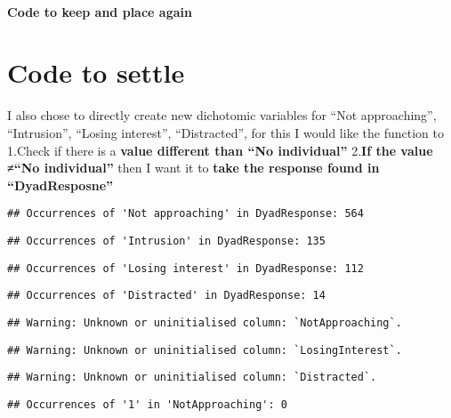 \documentclass[
]{article}
\begin{document}
\hypertarget{code-to-keep-and-place-again}{%
\paragraph{Code to keep and place
again}\label{code-to-keep-and-place-again}}

\hypertarget{code-to-settle}{%
\section{Code to settle}\label{code-to-settle}}

I also chose to directly create new dichotomic variables for ``Not
approaching'', ``Intrusion'', ``Losing interest'', ``Distracted'', for
this I would like the function to 1.Check if there is a \textbf{value
different than ``No individual''} 2.\textbf{If the value ≠``No
individual''} then I want it to \textbf{take the response found in
``DyadResposne''}

\begin{verbatim}
## Occurrences of 'Not approaching' in DyadResponse: 564
\end{verbatim}

\begin{verbatim}
## Occurrences of 'Intrusion' in DyadResponse: 135
\end{verbatim}

\begin{verbatim}
## Occurrences of 'Losing interest' in DyadResponse: 112
\end{verbatim}

\begin{verbatim}
## Occurrences of 'Distracted' in DyadResponse: 14
\end{verbatim}

\begin{verbatim}
## Warning: Unknown or uninitialised column: `NotApproaching`.
\end{verbatim}

\begin{verbatim}
## Warning: Unknown or uninitialised column: `LosingInterest`.
\end{verbatim}

\begin{verbatim}
## Warning: Unknown or uninitialised column: `Distracted`.
\end{verbatim}

\begin{verbatim}
## Occurrences of '1' in 'NotApproaching': 0
\end{verbatim}
\end{document}
